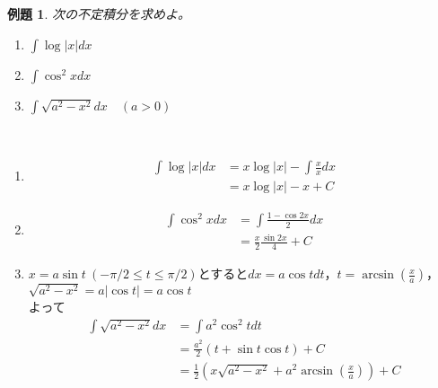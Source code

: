 \documentclass[dvipdfmx,a4j,10pt]{jsarticle}
\makeatletter
\theoremstyle{mystyle1}
\newtheorem{ex}[dfn]{例題}
\theoremstyle{mystyle2}
\newtheorem{ans}{解答}
\renewenvironment{ans}[1][解答]{\par
  \pushQED{\qed}%
  \normalfont
  \topsep6\p@\@plus6\p@ \trivlist
  \item[\hskip\labelsep{\bfseries\sffamily #1}]\ignorespaces
}{%
  \popQED\endtrivlist\@endpefalse
}
\makeatother
\begin{document}

\newpage

\begin{shaded}
\begin{ex}\label{ex9.2}
次の不定積分を求めよ。
\begin{enumerate}
\item $\displaystyle\int \log{|x|}dx$
\item $\displaystyle\int \cos^2 x dx$
\item $\displaystyle\int \sqrt{a^2-x^2} dx\quad(a>0)$
\end{enumerate}
\end{ex}
\end{shaded}

\begin{ans}[解答\ref{ex9.2}]\
    \begin{enumerate}
        \item
        \[
        \begin{split}
        \int \log{|x|} dx
        &=x\log{|x|}-\int\frac{x}{x} dx\\
        &=x\log{|x|}-x+C
        \end{split}
        \]
        \item
        \[
        \begin{split}
        \int \cos^2 x dx
        &=\int \frac{1-\cos{2x}}{2} dx\\
        &=\frac{x}{2}\frac{\sin{2x}}{4}+C
        \end{split}
        \]
        \item
        $x=a\sin{t}\ (-\pi/2\leq t\leq \pi/2)$とすると$dx=a\cos{t}dt$，$\displaystyle t=\arcsin{\left(\frac{x}{a}\right)}$，$\sqrt{a^2-x^2}=a|\cos{t}|=a\cos{t}$\\よって
        \[
        \begin{split}
        \int\sqrt{a^2-x^2} dx&=\int a^2\cos^2t dt\\
        &=\frac{a^2}{2}(t+\sin{t}\cos{t})+C\\
        &=\frac{1}{2}\left(x\sqrt{a^2-x^2}+a^2\arcsin{\left(\frac{x}{a}\right)}\right)+C
        \end{split}
        \]
    \end{enumerate}
\end{ans}
\end{document}
